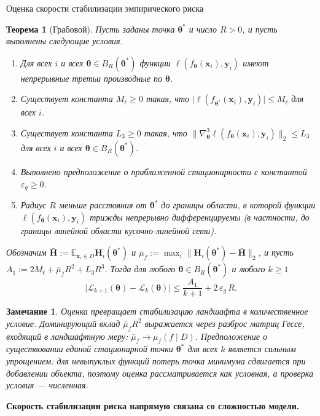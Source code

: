 \documentclass[9pt,pdf,hyperref={unicode}]{beamer}
\newtheorem{rustheorem}{Теорема}
\newtheorem{rusremark}{Замечание}
\newcommand{\key}[1]{\par\vspace{0.5ex}\noindent\textbf{\color{darkgreen}#1}}
\begin{document}
\begin{frame}{Оценка скорости стабилизации эмпирического риска}
\justifying
\footnotesize
\begin{rustheorem}[Грабовой]
    Пусть заданы точка $\boldsymbol{\theta}^*$ и число $R>0$, и пусть выполнены следующие условия.
    \begin{enumerate}[1)]
        \item Для всех $i$ и всех $\boldsymbol{\theta}\in B_R(\boldsymbol{\theta}^*)$ функции $\ell(f_{\boldsymbol{\theta}}(\mathbf{x}_i),\mathbf{y}_i)$ имеют непрерывные третьи производные по $\boldsymbol{\theta}$.
        \item Существует константа $M_\ell\ge 0$ такая, что $\bigl|\ell(f_{\boldsymbol{\theta}^*}(\mathbf{x}_i),\mathbf{y}_i)\bigr|\le M_\ell$ для всех $i$.
        \item Существует константа $L_3\ge 0$ такая, что $\bigl\|\nabla^{3}_{\boldsymbol{\theta}}\ell(f_{\boldsymbol{\theta}}(\mathbf{x}_i),\mathbf{y}_i)\bigr\|_2\le L_3$ для всех $i$ и всех $\boldsymbol{\theta}\in B_R(\boldsymbol{\theta}^*)$.
        \item Выполнено предположение о приближенной стационарности с константой $\varepsilon_g\ge 0$.
        \item Радиус $R$ меньше расстояния от $\boldsymbol{\theta}^*$ до границы области, в которой функции $\ell(f_{\boldsymbol{\theta}}(\mathbf{x}_i),\mathbf{y}_i)$ трижды непрерывно дифференцируемы (в частности, до границы линейной области кусочно-линейной сети).
    \end{enumerate}
    Обозначим $\bar{\mathbf{H}}:=\mathbb{E}_{\mathbf{x}_i\in D}\mathbf{H}_{i}(\boldsymbol{\theta}^*)$ и $\bar\mu_f:=\max_i\bigl\|\mathbf{H}_{i}(\boldsymbol{\theta}^*)-\bar{\mathbf{H}}\bigr\|_2$, и пусть $A_1:=2M_\ell+\bar\mu_f R^2+L_3 R^3$. Тогда для любого $\boldsymbol{\theta}\in B_R(\boldsymbol{\theta}^*)$ и любого $k\ge 1$
    \[
        \bigl|\mathcal{L}_{k+1}(\boldsymbol{\theta})-\mathcal{L}_k(\boldsymbol{\theta})\bigr|
        \le \frac{A_1}{k+1}+2\,\varepsilon_g\,R .
    \]
\end{rustheorem}
\begin{rusremark}
    Оценка превращает стабилизацию ландшафта в количественное условие. Доминирующий вклад $\bar\mu_f R^2$ выражается через разброс матриц Гессе, входящий в ландшафтную меру: $\bar\mu_f\to\mu_f(f\mid D)$. Предположение о существовании единой стационарной точки $\boldsymbol{\theta}^*$ для всех $k$ является сильным упрощением: для невыпуклых функций потерь точка минимума сдвигается при добавлении объекта, поэтому оценка рассматривается как условная, а проверка условия --- численная.
\end{rusremark}
\key{Скорость стабилизации риска напрямую связана со сложностью модели.}
\end{frame}
\end{document}
